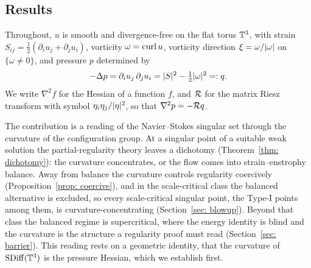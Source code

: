 \subsection{Results}

Throughout, $u$ is smooth and divergence-free on the flat torus $\mathbb{T}^3$, with
strain $S_{ij} = \tfrac12(\partial_i u_j + \partial_j u_i)$, vorticity
$\omega = \operatorname{curl} u$, vorticity direction $\xi = \omega/\lvert \omega \rvert$ on
$\{\omega \neq 0\}$, and pressure $p$ determined by
\begin{equation}\label{eq: pressure-poisson}
  -\Delta p = \partial_i u_j\,\partial_j u_i = \lvert S \rvert^2 - \tfrac12\lvert \omega \rvert^2
            =: q.
\end{equation}
We write $\nabla^2 f$ for the Hessian of a function $f$, and $\mathcal{R}$ for the
matrix Riesz transform with symbol $\eta_i\eta_j/\lvert \eta \rvert^2$, so that
$\nabla^2 p = -\mathcal{R} q$.

The contribution is a reading of the Navier--Stokes singular set through the
curvature of the configuration group. At a singular point of a suitable weak
solution the partial-regularity theory leaves a dichotomy
(Theorem~\ref{thm: dichotomy}): the curvature concentrates, or the flow comes into
strain--enstrophy balance. Away from balance the curvature controls regularity
coercively (Proposition~\ref{prop: coercive}), and in the scale-critical class the
balanced alternative is excluded, so every scale-critical singular point, the
Type-I points among them, is curvature-concentrating (Section~\ref{sec: blowup}).
Beyond that class the balanced regime is supercritical, where the energy identity is
blind and the curvature is the structure a regularity proof must read
(Section~\ref{sec: barrier}). This reading rests on a geometric identity, that the
curvature of $\operatorname{SDiff}(\mathbb{T}^3)$ is the pressure Hessian, which we establish first.

